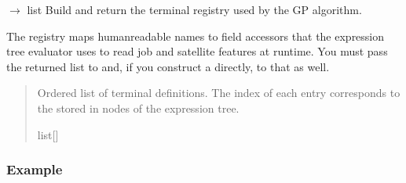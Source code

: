 \documentclass[letterpaper,10pt,english]{sphinxmanual}
\begin{document}
\begin{fulllineitems}
\label{\detokenize{api:scheduler.buildTerminalRegistry}}
\pysigstartsignatures
\pysiglinewithargsret
{}
{}
{{ $\rightarrow$ list\DUrole{p}{{[}}{\hyperref[\detokenize{api:scheduler.TerminalDef}]{\sphinxcrossref{scheduler.TerminalDef}}}\DUrole{p}{{]}}}}
\pysigstopsignatures
\sphinxAtStartPar
Build and return the terminal registry used by the GP algorithm.

\sphinxAtStartPar
The registry maps human\sphinxhyphen{}readable names to field accessors that the expression
tree evaluator uses to read job and satellite features at runtime.  You must
pass the returned list to {\hyperref[\detokenize{api:scheduler.FitnessEvaluator}]{}} and, if you construct
a  directly, to that as well.
\begin{quote}\begin{description}
\sphinxAtStartPar
Ordered list of terminal definitions.  The index of each entry corresponds
to the  stored in  nodes of the expression tree.

\sphinxAtStartPar
list{[}{\hyperref[\detokenize{api:scheduler.TerminalDef}]{}}{]}

\end{description}\end{quote}
\subsubsection*{Example}

\begin{sphinxVerbatim}[commandchars=\\\{\}]
    

  
  
\end{sphinxVerbatim}

\end{fulllineitems}

\label{\detokenize{api:module-schedulerlib}}
\end{document}
